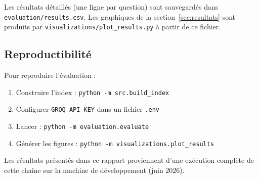 Les r\'esultats d\'etaill\'es (une ligne par question) sont sauvegard\'es dans
\texttt{evaluation/results.csv}. Les graphiques de la section~\ref{sec:resultats} sont produits
par \texttt{visualizations/plot\_results.py} \`a partir de ce fichier.

\subsection{Reproductibilit\'e}

Pour reproduire l'\'evaluation :
\begin{enumerate}[noitemsep]
  \item Construire l'index : \texttt{python -m src.build\_index}
  \item Configurer \texttt{GROQ\_API\_KEY} dans un fichier \texttt{.env}
  \item Lancer : \texttt{python -m evaluation.evaluate}
  \item G\'en\'erer les figures : \texttt{python -m visualizations.plot\_results}
\end{enumerate}

Les r\'esultats pr\'esent\'es dans ce rapport proviennent d'une ex\'ecution compl\`ete de cette
cha\^ine sur la machine de d\'eveloppement (juin 2026).
